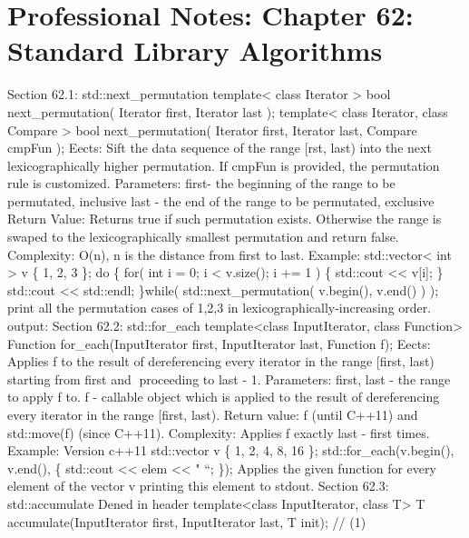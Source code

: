 \hypertarget{professional-notes-chapter-62-standard-library-algorithms-1}{%
\section{Professional Notes: Chapter 62: Standard Library
Algorithms}\label{professional-notes-chapter-62-standard-library-algorithms-1}}

Section 62.1: std::next\_permutation template\textless{} class Iterator
\textgreater{} bool next\_permutation( Iterator first, Iterator last );
template\textless{} class Iterator, class Compare \textgreater{} bool
next\_permutation( Iterator first, Iterator last, Compare cmpFun );
Eects: Sift the data sequence of the range {[}rst, last) into the next
lexicographically higher permutation. If cmpFun is provided, the
permutation rule is customized. Parameters: first- the beginning of the
range to be permutated, inclusive last - the end of the range to be
permutated, exclusive Return Value: Returns true if such permutation
exists. Otherwise the range is swaped to the lexicographically smallest
permutation and return false. Complexity: O(n), n is the distance from
first to last. Example: std::vector\textless{} int \textgreater{} v \{
1, 2, 3 \}; do \{ for( int i = 0; i \textless{} v.size(); i += 1 ) \{
std::cout \textless\textless{} v{[}i{]}; \} std::cout
\textless\textless{} std::endl; \}while( std::next\_permutation(
v.begin(), v.end() ) ); print all the permutation cases of 1,2,3 in
lexicographically-increasing order. output: Section 62.2: std::for\_each
template\textless class InputIterator, class Function\textgreater{}
Function for\_each(InputIterator first, InputIterator last, Function f);
Eects: Applies f to the result of dereferencing every iterator in the
range {[}first, last) starting from first and proceeding to last - 1.
Parameters: first, last - the range to apply f to. f - callable object
which is applied to the result of dereferencing every iterator in the
range {[}first, last). Return value: f (until C++11) and std::move(f)
(since C++11). Complexity: Applies f exactly last - first times.
Example: Version c++11 std::vector v \{ 1, 2, 4, 8, 16 \};
std::for\_each(v.begin(), v.end(), \href{int\%20elem}{} \{ std::cout
\textless\textless{} elem \textless\textless{} " ``; \}); Applies the
given function for every element of the vector v printing this element
to stdout. Section 62.3: std::accumulate Dened in header
template\textless class InputIterator, class T\textgreater{} T
accumulate(InputIterator first, InputIterator last, T init); // (1)
